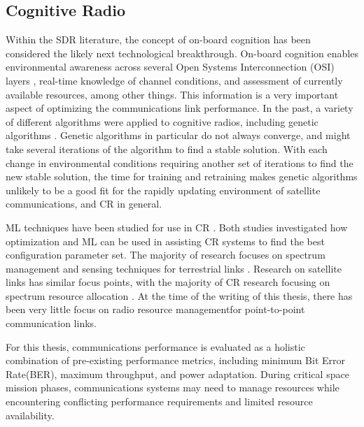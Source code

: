 \subsection{Cognitive Radio}
\par Within the SDR literature, the concept of on-board cognition has been considered the likely next technological breakthrough.  On-board cognition enables environmental awareness across several Open Systems Interconnection (OSI) layers \cite{paulo39}, real-time knowledge of channel conditions, and assessment of currently available resources, among other things. This information is a very important aspect of optimizing the communications link performance. In the past,  a variety of different algorithms were applied to cognitive radios\cite{paulo41}, including genetic algorithms \cite{paulo40}. Genetic algorithms in particular do not always converge, and might take several iterations of the algorithm to find a stable solution. With each change in environmental conditions requiring another set of iterations to find the new stable solution, the time for training and retraining makes genetic algorithms unlikely to be a good fit for the rapidly updating environment of satellite communications, and CR in general.
\par ML techniques have been studied for use in CR \cite{paulo42,paulo45}. Both studies investigated how optimization and ML can be used in assisting CR systems to find the best configuration parameter set. The majority of research focuses on spectrum management and sensing techniques for terrestrial links \cite{paulo45,paulo47}. Research on satellite links has similar focus points, with the majority of CR research focusing on spectrum resource allocation \cite{paulo48,paulo50}. At the time of the writing of this thesis, there has been very little focus on radio resource managementfor point-to-point communication links.
\par For this thesis, communications performance is evaluated as a holistic combination of pre-existing performance metrics, including minimum Bit Error Rate(BER), maximum throughput, and power adaptation. During critical space mission phases, communications systems may need to manage resources while encountering conflicting performance requirements and limited resource availability. 
